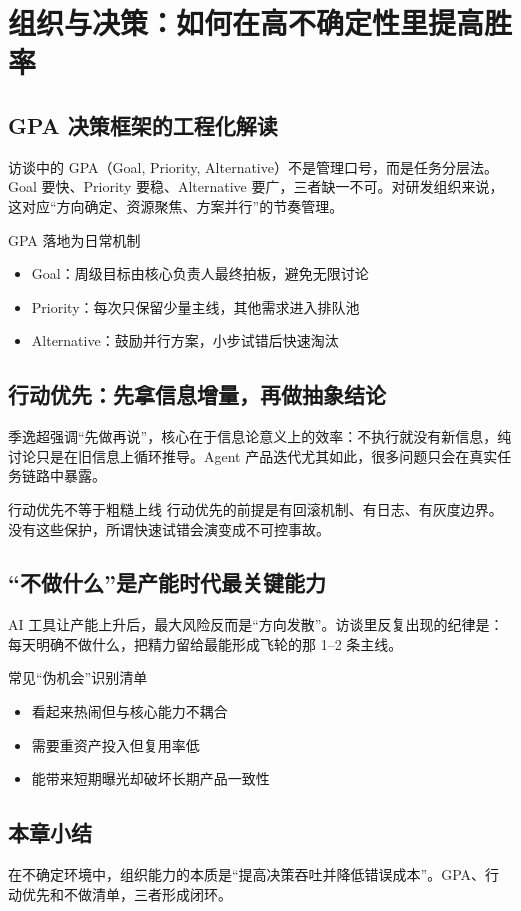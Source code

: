 \section{组织与决策：如何在高不确定性里提高胜率}

\subsection{GPA 决策框架的工程化解读}

访谈中的 GPA（Goal, Priority, Alternative）不是管理口号，而是任务分层法。Goal 要快、Priority 要稳、Alternative 要广，三者缺一不可。对研发组织来说，这对应“方向确定、资源聚焦、方案并行”的节奏管理。

\begin{importantbox}{GPA 落地为日常机制}
\begin{itemize}
    \item Goal：周级目标由核心负责人最终拍板，避免无限讨论
    \item Priority：每次只保留少量主线，其他需求进入排队池
    \item Alternative：鼓励并行方案，小步试错后快速淘汰
\end{itemize}
\end{importantbox}

\subsection{行动优先：先拿信息增量，再做抽象结论}

季逸超强调“先做再说”，核心在于信息论意义上的效率：不执行就没有新信息，纯讨论只是在旧信息上循环推导。Agent 产品迭代尤其如此，很多问题只会在真实任务链路中暴露。

\begin{warningbox}{行动优先不等于粗糙上线}
行动优先的前提是有回滚机制、有日志、有灰度边界。没有这些保护，所谓快速试错会演变成不可控事故。
\end{warningbox}

\subsection{“不做什么”是产能时代最关键能力}

AI 工具让产能上升后，最大风险反而是“方向发散”。访谈里反复出现的纪律是：每天明确不做什么，把精力留给最能形成飞轮的那 1--2 条主线。

\begin{knowledgebox}{常见“伪机会”识别清单}
\begin{itemize}
    \item 看起来热闹但与核心能力不耦合
    \item 需要重资产投入但复用率低
    \item 能带来短期曝光却破坏长期产品一致性
\end{itemize}
\end{knowledgebox}

\subsection{本章小结}

在不确定环境中，组织能力的本质是“提高决策吞吐并降低错误成本”。GPA、行动优先和不做清单，三者形成闭环。


